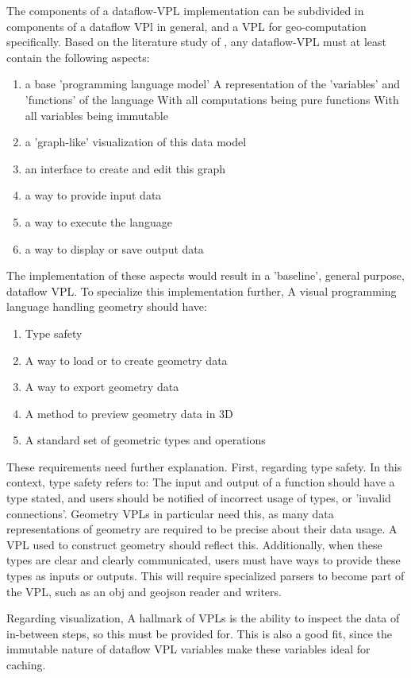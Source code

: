 The components of a dataflow-VPL implementation can be subdivided in components of a dataflow VPl in general, and a VPL for geo-computation specifically.
Based on the literature study of , any dataflow-VPL must at least contain the following aspects: 
\begin{enumerate}[-]
  \item a base 'programming language model'
  \subitem A representation of the 'variables' and 'functions' of the language
  \subitem With all computations being pure functions
  \subitem With all variables being immutable
  \item a 'graph-like' visualization of this data model
  \item an interface to create and edit this graph 
  \item a way to provide input data 
  \item a way to execute the language
  \item a way to display or save output data
\end{enumerate}
The implementation of these aspects would result in a 'baseline', general purpose, dataflow VPL. 
To specialize this implementation further, A visual programming language handling geometry should have:
\begin{enumerate}[-]
  \item Type safety 
  \item A way to load or to create geometry data 
  \item A way to export geometry data
  \item A method to preview geometry data in 3D
  \item A standard set of geometric types and operations
\end{enumerate}
These requirements need further explanation.
First, regarding type safety.
In this context, type safety refers to: 
The input and output of a function should have a type stated, and users should be notified of incorrect usage of types, or 'invalid connections'.
Geometry VPLs in particular need this, as many data representations of geometry are required to be precise about their data usage.
A VPL used to construct geometry should reflect this.
Additionally, when these types are clear and clearly communicated, users must have ways to provide these types as inputs or outputs. 
This will require specialized parsers to become part of the VPL, such as an obj and geojson reader and writers. 

Regarding visualization, A hallmark of VPLs is the ability to inspect the data of in-between steps, so this must be provided for.
This is also a good fit, since the immutable nature of dataflow VPL variables make these variables ideal for caching. 

